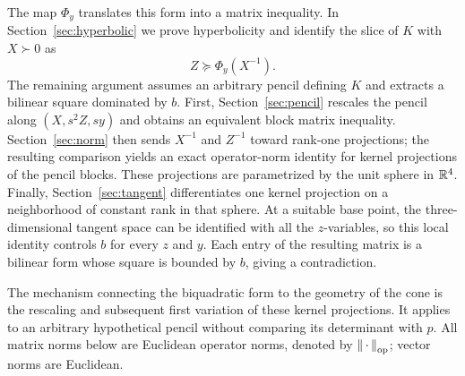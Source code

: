 The map $\Phi_y$ translates this form into a matrix inequality. In
Section~\ref{sec:hyperbolic} we prove hyperbolicity and identify the slice
of $K$ with $X\succ0$ as
\[
 Z\succeq\Phi_y(X^{-1}).
\]
The remaining argument assumes an arbitrary pencil defining $K$ and
extracts a bilinear square dominated by $b$.
First, Section~\ref{sec:pencil} rescales the pencil along
$(X,s^2Z,sy)$ and obtains an equivalent block matrix inequality.
Section~\ref{sec:norm} then sends $X^{-1}$ and $Z^{-1}$ toward rank-one projections;
the resulting comparison yields an exact operator-norm identity for
kernel projections of the pencil blocks. These projections are
parametrized by the unit sphere in $\mathbb R^4$.
Finally, Section~\ref{sec:tangent} differentiates one kernel projection
on a neighborhood of constant rank in that sphere. At a suitable base
point, the three-dimensional tangent space can be identified with all
the $z$-variables, so this
local identity controls $b$ for every $z$ and $y$.
Each entry of the resulting matrix
is a bilinear form whose square is bounded by $b$, giving a contradiction.

The mechanism connecting the biquadratic form to the geometry of the cone
is the rescaling and subsequent first variation of these kernel
projections. It applies to an arbitrary hypothetical pencil without
comparing its determinant with $p$.
All matrix norms below are Euclidean operator norms, denoted by
$\left\lVert\,\cdot\,\right\rVert_{\mathrm{op}}$; vector norms are Euclidean.
